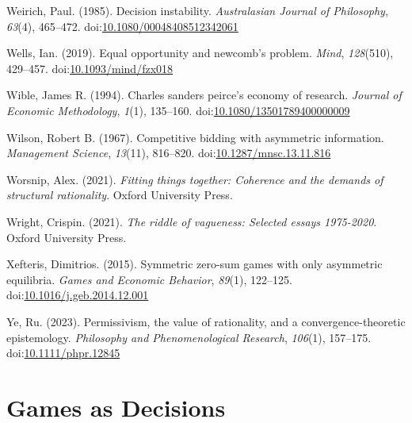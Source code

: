 \documentclass[
  12pt,
  letterpaper,
  DIV=11,
  numbers=noendperiod]{scrreprt}
\newlength{\cslhangindent}
\newenvironment{CSLReferences}[2] %
 {\begin{list}{}{%
  \setlength{\itemindent}{0pt}
  \setlength{\leftmargin}{0pt}
  \setlength{\parsep}{0pt}
  \ifodd #1
   \setlength{\leftmargin}{\cslhangindent}
   \setlength{\itemindent}{-1\cslhangindent}
  \fi
  \setlength{\itemsep}{#2\baselineskip}}}
 {\end{list}}
\begin{document}
\begin{CSLReferences}{1}{0}
Weirich, Paul. (1985). Decision instability. \emph{Australasian Journal
of Philosophy}, \emph{63}(4), 465--472.
doi:\href{https://doi.org/10.1080/00048408512342061}{10.1080/00048408512342061}

Wells, Ian. (2019). Equal opportunity and newcomb's problem.
\emph{Mind}, \emph{128}(510), 429--457.
doi:\href{https://doi.org/10.1093/mind/fzx018}{10.1093/mind/fzx018}

Wible, James R. (1994). Charles sanders peirce's economy of research.
\emph{Journal of Economic Methodology}, \emph{1}(1), 135--160.
doi:\href{https://doi.org/10.1080/13501789400000009}{10.1080/13501789400000009}

Wilson, Robert B. (1967). Competitive bidding with asymmetric
information. \emph{Management Science}, \emph{13}(11), 816--820.
doi:\href{https://doi.org/10.1287/mnsc.13.11.816}{10.1287/mnsc.13.11.816}

Worsnip, Alex. (2021). \emph{Fitting things together: Coherence and the
demands of structural rationality}. Oxford University Press.

Wright, Crispin. (2021). \emph{The riddle of vagueness: Selected essays
1975-2020}. Oxford University Press.

Xefteris, Dimitrios. (2015). Symmetric zero-sum games with only
asymmetric equilibria. \emph{Games and Economic Behavior}, \emph{89}(1),
122--125.
doi:\href{https://doi.org/10.1016/j.geb.2014.12.001}{10.1016/j.geb.2014.12.001}

Ye, Ru. (2023). Permissivism, the value of rationality, and a
convergence-theoretic epistemology. \emph{Philosophy and
Phenomenological Research}, \emph{106}(1), 157--175.
doi:\href{https://doi.org/10.1111/phpr.12845}{10.1111/phpr.12845}

\end{CSLReferences}

\cleardoublepage
{}
{}
\appendix

\chapter{Games as Decisions}\label{sec-gad}
\end{document}

